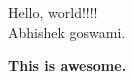 \documentclass{article}
\begin{document}
    Hello, world!!!!\\
    
    Abhishek goswami.
    
    \textbf{This is awesome.}
\end{document}
